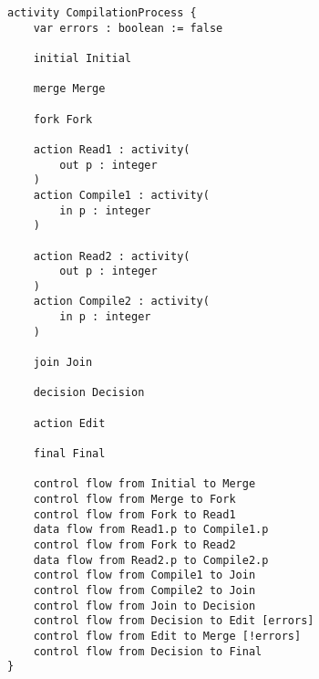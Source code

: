 \begin{lstlisting}[float,language=activity, caption={Gamma Activity Language representation of the compilation activity.}, label={lst:gamma-activity}]
activity CompilationProcess {
	var errors : boolean := false
	
	initial Initial
	
	merge Merge
	
	fork Fork
	
	action Read1 : activity(
		out p : integer
	)
	action Compile1 : activity(
		in p : integer
	)
	
	action Read2 : activity(
		out p : integer
	)
	action Compile2 : activity(
		in p : integer
	)
	
	join Join
	
	decision Decision
	
	action Edit
	
	final Final
	
	control flow from Initial to Merge 
	control flow from Merge to Fork 
	control flow from Fork to Read1 
	data flow from Read1.p to Compile1.p
	control flow from Fork to Read2 
	data flow from Read2.p to Compile2.p
	control flow from Compile1 to Join 
	control flow from Compile2 to Join 
	control flow from Join to Decision 
	control flow from Decision to Edit [errors]
	control flow from Edit to Merge [!errors]
	control flow from Decision to Final
}	
\end{lstlisting}